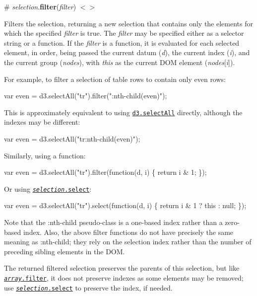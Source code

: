 \label{_selection_filter}%
\# {\itshape selection}.{\bfseries filter}({\itshape filter}) \href{https://github.com/d3/d3-selection/blob/master/src/selection/filter.js}{\tt $<$$>$}

Filters the selection, returning a new selection that contains only the elements for which the specified {\itshape filter} is true. The {\itshape filter} may be specified either as a selector string or a function. If the {\itshape filter} is a function, it is evaluated for each selected element, in order, being passed the current datum ({\itshape d}), the current index ({\itshape i}), and the current group ({\itshape nodes}), with {\itshape this} as the current D\+OM element ({\itshape nodes}\mbox{[}{\itshape i}\mbox{]}).

For example, to filter a selection of table rows to contain only even rows\+:


\begin{DoxyCode}
var even = d3.selectAll("tr").filter(":nth-child(even)");
\end{DoxyCode}


This is approximately equivalent to using \href{#selectAll}{\tt d3.\+select\+All} directly, although the indexes may be different\+:


\begin{DoxyCode}
var even = d3.selectAll("tr:nth-child(even)");
\end{DoxyCode}


Similarly, using a function\+:


\begin{DoxyCode}
var even = d3.selectAll("tr").filter(function(d, i) \{ return i & 1; \});
\end{DoxyCode}


Or using \href{#selection_select}{\tt {\itshape selection}.select}\+:


\begin{DoxyCode}
var even = d3.selectAll("tr").select(function(d, i) \{ return i & 1 ? this : null; \});
\end{DoxyCode}


Note that the {\ttfamily \+:nth-\/child} pseudo-\/class is a one-\/based index rather than a zero-\/based index. Also, the above filter functions do not have precisely the same meaning as {\ttfamily \+:nth-\/child}; they rely on the selection index rather than the number of preceding sibling elements in the D\+OM.

The returned filtered selection preserves the parents of this selection, but like \href{https://developer.mozilla.org/en-US/docs/Web/JavaScript/Reference/Global_Objects/Array/filter}{\tt {\itshape array}.filter}, it does not preserve indexes as some elements may be removed; use \href{#selection_select}{\tt {\itshape selection}.select} to preserve the index, if needed.

